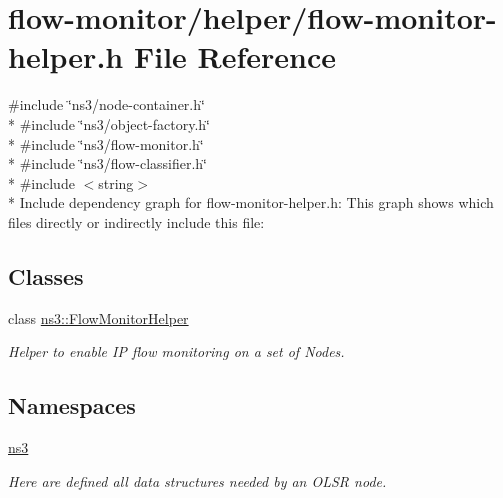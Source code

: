 \hypertarget{flow-monitor-helper_8h}{}\section{flow-\/monitor/helper/flow-\/monitor-\/helper.h File Reference}
\label{flow-monitor-helper_8h}
{\ttfamily \#include \char`\"{}ns3/node-\/container.\+h\char`\"{}}\\*
{\ttfamily \#include \char`\"{}ns3/object-\/factory.\+h\char`\"{}}\\*
{\ttfamily \#include \char`\"{}ns3/flow-\/monitor.\+h\char`\"{}}\\*
{\ttfamily \#include \char`\"{}ns3/flow-\/classifier.\+h\char`\"{}}\\*
{\ttfamily \#include $<$string$>$}\\*
Include dependency graph for flow-\/monitor-\/helper.h\+:
This graph shows which files directly or indirectly include this file\+:
\subsection*{Classes}
\begin{DoxyCompactItemize}
\item 
class \hyperlink{classns3_1_1FlowMonitorHelper}{ns3\+::\+Flow\+Monitor\+Helper}
\begin{DoxyCompactList}\small\item\em Helper to enable IP flow monitoring on a set of Nodes. \end{DoxyCompactList}\end{DoxyCompactItemize}
\subsection*{Namespaces}
\begin{DoxyCompactItemize}
\item 
 \hyperlink{namespacens3}{ns3}
\begin{DoxyCompactList}\small\item\em Here are defined all data structures needed by an O\+L\+SR node. \end{DoxyCompactList}\end{DoxyCompactItemize}
